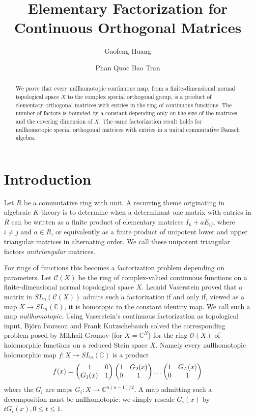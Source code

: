 \documentclass[11pt]{amsart}
\title{Elementary Factorization for Continuous Orthogonal Matrices}
\author[G. Huang]{Gaofeng Huang}
\author[B. Tran]{Phan Quoc Bao Tran}
\theoremstyle{definition}
\theoremstyle{remark}
\theoremstyle{remark}
\newcommand{\C}{\mathbb{C}}
\begin{document}
\maketitle
\begin{abstract}
    We prove that every nullhomotopic continuous map, from a finite-dimensional
    normal topological space $X$ to the complex special orthogonal group,  is a product of elementary orthogonal
    matrices with entries in the ring of continuous functions. The
    number of factors is bounded by a constant depending only on the size of the matrices and the
    covering dimension of $X$. The same factorization result holds for nullhomotopic special orthogonal matrices with entries in a unital commutative Banach algebra.
\end{abstract}


\section{Introduction}

Let $R$ be a commutative ring with unit. A recurring theme originating in algebraic $K$-theory is to determine when a determinant-one matrix with entries in $R$ can be written as a finite product of elementary matrices $I_n+a E_{ij}$, where $i\ne j$ and $a\in R$, or equivalently as a finite product of unipotent lower and upper triangular matrices in alternating order. We call these unipotent triangular factors \emph{unitriangular} matrices. 

\smallskip
For rings of functions this becomes a factorization problem depending on parameters. Let $\mathcal{C}(X)$ be the ring of complex-valued continuous functions on a finite-dimensional normal topological space $X$. Leonid Vaserstein \cite{04073958} proved that a matrix in $SL_n(\mathcal{C}(X))$ admits such a factorization if and only if, viewed as a map $X\to SL_n(\C)$, it is homotopic to the constant identity map. We call such a map \emph{nullhomotopic}. 
Using Vaserstein's continuous factorization as topological input, Bj{\" o}rn Ivarsson and Frank Kutzschebauch \cite{06014072} solved the corresponding problem posed by Mikhail Gromov \cite{MR1001851} (for $X = \C^N$) for the ring $\mathcal{O}(X)$ of holomorphic functions on a reduced Stein space $X$. Namely every nullhomotopic holomorphic map $f: X \to SL_n(\C)$ is a product
\begin{align*}
    f(x) = \left(\begin{matrix} 1 & 0 \cr G_1(x) & 1 \cr \end{matrix} \right)   
\left(\begin{matrix} 1 & G_2(x) \cr 0 & 1 \cr \end{matrix} \right)  \ldots \left(\begin{matrix} 1 & G_L(x)\cr 0 & 1 \cr \end{matrix} \right) 
\end{align*}
where the $G_i$ are maps $G_i : X \to \mathbb{C}^{n(n-1)/2}$. A map admitting such a decomposition must be nullhomotopic: we simply rescale $G_i(x)$ by $t G_i(x), 0 \le t \le 1$. 
\end{document}
